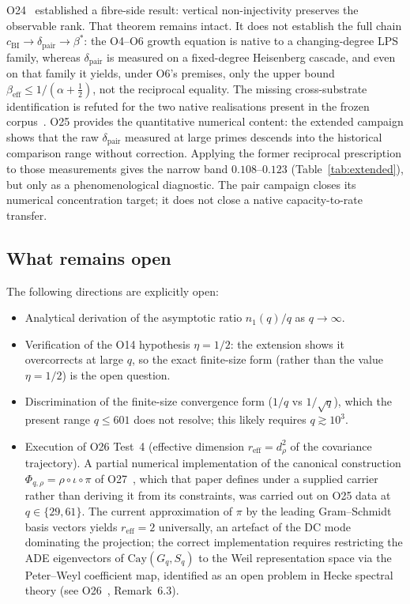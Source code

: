 \documentclass[11pt,a4paper]{article}
\theoremstyle{definition}
\newcommand{\dpair}{\delta_{\mathrm{pair}}}
\newcommand{\bstar}{\beta^{*}}
\begin{document}
      O24~\cite{Beau2026a28} established a fibre-side result: vertical non-injectivity preserves
      the observable rank.  That theorem remains intact.  It does not establish the full chain
      $c_{\mathrm{BI}} \to \dpair \to \bstar$: the O4--O6 growth equation is native to a
      changing-degree LPS family, whereas $\dpair$ is measured on a fixed-degree Heisenberg
      cascade, and even on that family it yields, under O6's premises, only the upper bound
      $\beta_{\mathrm{eff}} \le 1/(\alpha+\tfrac12)$, not the reciprocal equality.
      The missing cross-substrate identification is refuted for the two native
      realisations present in the frozen corpus~\cite{Beau2026sgn}.
      O25 provides the quantitative numerical content: the extended campaign shows that the raw
      $\dpair$ measured at large primes descends into the historical comparison range without
      correction.
      Applying the former reciprocal prescription to those measurements gives the narrow band
      $0.108$--$0.123$ (Table~\ref{tab:extended}), but only as a phenomenological diagnostic.
      The pair campaign closes its numerical concentration target; it does not close a native
      capacity-to-rate transfer.

    \subsection{What remains open}

      The following directions are explicitly open:
      \begin{itemize}
        \item Analytical derivation of the asymptotic ratio $n_1(q)/q$ as $q \to \infty$.
        \item Verification of the O14 hypothesis $\eta = 1/2$: the extension shows it overcorrects
        at large $q$, so the exact finite-size form (rather than the value $\eta = 1/2$) is the
        open question.
        \item Discrimination of the finite-size convergence form ($1/q$ vs $1/\sqrt{q}$), which
        the present range $q \le 601$ does not resolve; this likely requires $q \gtrsim 10^3$.
        \item Execution of O26 Test~4 (effective dimension $r_{\mathrm{eff}} = d_\rho^2$
        of the covariance trajectory).
        A partial numerical implementation of the canonical construction
        $\Phi_{q,\rho} = \rho \circ \iota \circ \pi$ of O27~\cite{Beau2026a31}, which that paper
        defines under a supplied carrier rather than deriving it from its constraints, was carried
        out on O25 data at $q \in \{29, 61\}$.
        The current approximation of $\pi$ by the leading Gram--Schmidt basis vectors
        yields $r_{\mathrm{eff}} = 2$ universally, an artefact of the DC mode dominating
        the projection; the correct implementation requires restricting the ADE
        eigenvectors of $\mathrm{Cay}(G_q, S_q)$ to the Weil representation space
        via the Peter--Weyl coefficient map,
        identified as an open problem in Hecke spectral theory
        (see O26~\cite{Beau2026a30}, Remark~6.3).
      \end{itemize}
\end{document}
